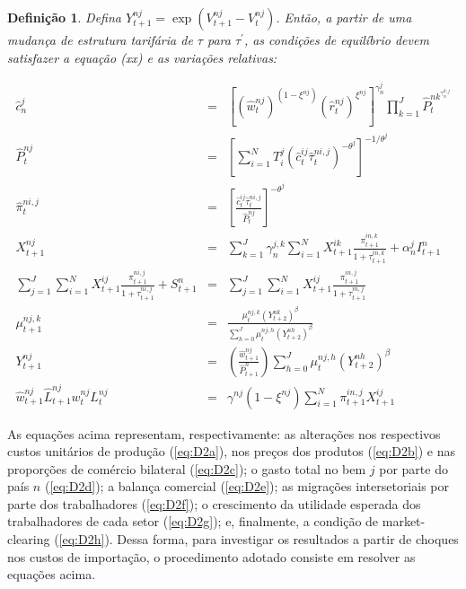 \documentclass{article}
\newtheorem{mydef}{Definição}
\begin{document}
\begin{mydef}
Defina $Y_{t+1}^{nj}=\exp⁡(V_{t+1}^{nj}-V_t^{nj})$. Então, a partir de uma mudança de estrutura tarifária de $\tau$ para $\tau^{'}$, as condições de equilíbrio devem satisfazer a equação (xx) e as variações relativas:

\begin{eqnarray}
    \label{eq:D2a}
    \hat{c}_n^j &=& [(\hat{w}_t^{nj})^{(1 - \xi^{nj} ) } (\hat{r}_t^{nj} )^{ \xi^{nj} } ]^{\gamma_n^j } \prod_{k=1}^J 
    \hat{P}_t^{nk^ { \gamma_n^{k,j} } }  \\
    \label{eq:D2b}
    \hat{P}_t^{nj} &=& [\sum_{i=1}^N T_i^j (\hat{c}_t^{ij} \hat{\tau}_t^{ni,j})^{-\theta^j}]^{-1 / \theta^j } \\
    \label{eq:D2c}
    \hat{\pi}_t^{ni,j} &=& [\frac{\hat{c}_t^{ij} \hat{\tau}_t^{ni,j}}{\hat{P}_t^{nj}}]^{-\theta^j} \\
    \label{eq:D2d}
    X_{t+1}^{nj} &=& \sum_{k=1}^J \gamma_n^{j,k}  \sum_{i=1}^N X_{t+1}^{ik}   \frac{\pi_{t+1}^{in,k}}{1+\tau_{t+1}^{in,k}} + \alpha_n^j I_{t+1}^n \\
    \label{eq:D2e}
    \sum_{j=1}^J \sum_{i=1}^N X_{t+1}^{ij}  \frac{\pi_{t+1}^{ni,j}}{1+\tau_{t+1}^{ni,j}} + S_{t+1}^n &=& \sum_{j=1}^J \sum_{i=1}^N X_{t+1}^{ij}  \frac{ \pi_{t+1}^{in,j}}{1+\tau_{t+1}^{in,j} } \\
    \label{eq:D2f}
    \mu_{t+1}^{nj,k} &=& \frac{\mu_t^{nj,k} (Y_{t+2}^{nk} )^\beta }{ \sum_{h=0}^J \mu_t^{nj,h} (Y_{t+2}^{nh} )^\beta } \\
    \label{eq:D2g}
    Y_{t+1}^{nj} &=& (\frac{\hat{w}_{t+1}^{nj}}{\hat{P}_{t+1}^n}) \sum_{h=0}^J \mu_t^{nj,h} (Y_{t+2}^{nh})^\beta \\
    \label{eq:D2h}
    \hat{w}_{t+1}^{nj} \hat{L}_{t+1}^{nj} w_t^{nj} L_t^{nj} &=& \gamma^{nj} (1-\xi^{nj}) \sum_{i=1}^N \pi_{t+1}^{in,j} X_{t+1}^{ij}
    \end{eqnarray}
\end{mydef}

As equações acima representam, respectivamente: as alterações nos respectivos custos unitários de produção (\ref{eq:D2a}), nos preços dos produtos (\ref{eq:D2b}) e nas proporções de comércio bilateral (\ref{eq:D2c}); o gasto total no bem $j$ por parte do país $n$ (\ref{eq:D2d}); a balança comercial (\ref{eq:D2e}); as migrações intersetoriais por parte dos trabalhadores (\ref{eq:D2f}); o crescimento da utilidade esperada dos trabalhadores de cada setor (\ref{eq:D2g}); e, finalmente, a condição de market-clearing (\ref{eq:D2h}). Dessa forma, para investigar os resultados a partir de choques nos custos de importação, o procedimento adotado consiste em resolver as equações acima.
\end{document}
